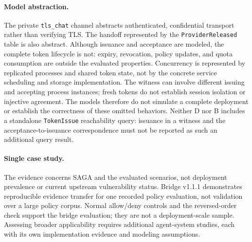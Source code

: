 \paragraph{Model abstraction.}
The private \texttt{tls\_chat} channel abstracts authenticated, confidential
transport rather than verifying TLS. The handoff represented by the
\texttt{ProviderReleased} table is also abstract.
Although issuance and acceptance are modeled, the complete token lifecycle
is not: expiry, revocation, policy updates, and quota consumption are outside
the evaluated properties. Concurrency is represented by replicated processes
and shared token state, not by the concrete service scheduling and storage
implementation. The witness can involve different issuing and accepting
process instances; fresh tokens do not establish session isolation or
injective agreement. The models therefore do not simulate a complete
deployment or establish the correctness of these omitted behaviors.
Neither D nor B includes a standalone \texttt{TokenIssue} reachability
query: issuance in a witness and the acceptance-to-issuance correspondence
must not be reported as such an additional query result.

\paragraph{Single case study.}
The evidence concerns SAGA and the evaluated scenarios, not deployment
prevalence or current upstream vulnerability status. Bridge v1.1.1
demonstrates reproducible evidence transfer for one recorded policy
evaluation, not validation over a large policy corpus. Normal allow/deny
controls and the reversed-order check support the bridge evaluation;
they are not a deployment-scale sample. Assessing broader applicability
requires additional agent-system studies, each with its own implementation
evidence and modeling assumptions.

